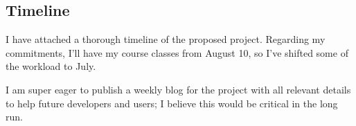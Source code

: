 \subsection{Timeline}

    I have attached a thorough timeline of the proposed project. 
    Regarding my commitments, I'll have my course classes from August 10, so I've shifted some of the workload to July.
    
    I am super eager to publish a weekly blog for the project with all relevant details to help future developers and users; I believe this would be critical in the long run.
   
